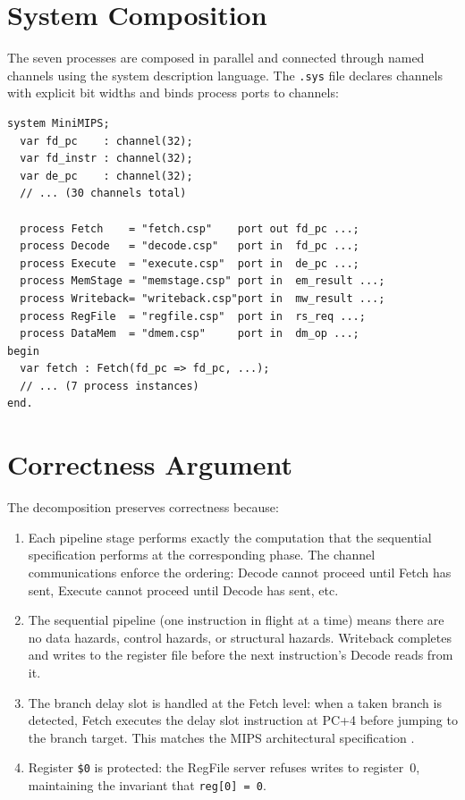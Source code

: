 \documentclass[11pt]{article}
\begin{document}
\section{System Composition}

The seven processes are composed in parallel and connected through named
channels using the system description language.  The \texttt{.sys} file
declares channels with explicit bit widths and binds process ports to
channels:

\begin{lstlisting}[style=csp,caption={System description (abbreviated)}]
system MiniMIPS;
  var fd_pc    : channel(32);
  var fd_instr : channel(32);
  var de_pc    : channel(32);
  // ... (30 channels total)

  process Fetch    = "fetch.csp"    port out fd_pc ...;
  process Decode   = "decode.csp"   port in  fd_pc ...;
  process Execute  = "execute.csp"  port in  de_pc ...;
  process MemStage = "memstage.csp" port in  em_result ...;
  process Writeback= "writeback.csp"port in  mw_result ...;
  process RegFile  = "regfile.csp"  port in  rs_req ...;
  process DataMem  = "dmem.csp"     port in  dm_op ...;
begin
  var fetch : Fetch(fd_pc => fd_pc, ...);
  // ... (7 process instances)
end.
\end{lstlisting}

\section{Correctness Argument}

The decomposition preserves correctness because:

\begin{enumerate}
\item Each pipeline stage performs exactly the computation that the sequential
  specification performs at the corresponding phase.  The channel
  communications enforce the ordering: Decode cannot proceed until Fetch has
  sent, Execute cannot proceed until Decode has sent, etc.

\item The sequential pipeline (one instruction in flight at a time) means there
  are no data hazards, control hazards, or structural hazards.  Writeback
  completes and writes to the register file before the next instruction's
  Decode reads from it.

\item The branch delay slot is handled at the Fetch level: when a taken branch
  is detected, Fetch executes the delay slot instruction at PC+4 before
  jumping to the branch target.  This matches the MIPS architectural
  specification \cite{MIPSR3000,Patterson2014}.

\item Register \texttt{\$0} is protected: the RegFile server refuses writes to
  register~0, maintaining the invariant that \texttt{reg[0]~=~0}.
\end{enumerate}
\end{document}
